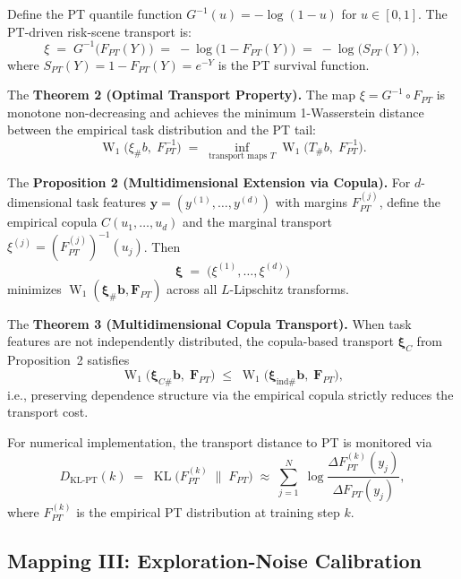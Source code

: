 \documentclass[10pt]{article}
\DeclareMathOperator{\KL}{KL}
\DeclareMathOperator{\W}{W}
\begin{document}
Define the PT quantile function $G^{-1}(u)=-\log(1-u)$ for $u\in[0,1]$.
The PT-driven risk-scene transport is:
\begin{equation}
  \xi \;=\; G^{-1}\!\big(F_{PT}(Y)\big)
       \;=\; -\log\!\big(1 - F_{PT}(Y)\big)
       \;=\; -\log\!\big(S_{PT}(Y)\big),
  \tag{Mapping II}
  \label{eq:mapping2}
\end{equation}
where $S_{PT}(Y)=1-F_{PT}(Y)=e^{-Y}$ is the PT survival function.

The \textbf{Theorem 2 (Optimal Transport Property).}
The map $\xi=G^{-1}\circ F_{PT}$ is monotone non-decreasing and achieves the
minimum 1-Wasserstein distance between the empirical task distribution and the PT tail:
\[
  \W_1\!\big(\xi_\# b,\;F_{PT}^{-1}\big)
  \;=\; \inf_{\text{transport maps }T}
       \W_1\!\big(T_\# b,\;F_{PT}^{-1}\big).
\]

The \textbf{Proposition 2 (Multidimensional Extension via Copula).}
For $d$-dimensional task features $\mathbf{y}=(y^{(1)},\dots,y^{(d)})$ with margins
$F^{(j)}_{PT}$, define the empirical copula $C(u_1,\dots,u_d)$ and the marginal
transport $\xi^{(j)}=(F^{(j)}_{PT})^{-1}(u_j)$.  Then
\[
  \boldsymbol{\xi} \;=\; \big(\xi^{(1)},\dots,\xi^{(d)}\big)
  \tag{Prop 2}
  \label{eq:mapping2_multi}
\]
minimizes $\W_1(\boldsymbol{\xi}_\#\mathbf{b},\mathbf{F}_{PT})$ across all
$L$-Lipschitz transforms.

The \textbf{Theorem 3 (Multidimensional Copula Transport).}
When task features are not independently distributed, the copula-based transport
$\boldsymbol{\xi}_C$ from Proposition~2 satisfies
\[
  \W_1\!\big(\boldsymbol{\xi}_{C\#}\mathbf{b},\;\mathbf{F}_{PT}\big)
  \;\le\; \W_1\!\big(\boldsymbol{\xi}_{\text{ind\#}}\mathbf{b},\;\mathbf{F}_{PT}\big),
\]
i.e., preserving dependence structure via the empirical copula strictly reduces the
transport cost.

For numerical implementation, the transport distance to PT is monitored via
\begin{equation}
  D_{\text{KL-PT}}(k) \;=\;
    \KL\!\big(F_{PT}^{(k)}\;\|\;F_{PT}\big)
    \;\approx\; \sum_{j=1}^{N}\;
      \log\!\frac{\Delta F_{PT}^{(k)}(y_j)}{\Delta F_{PT}(y_j)},
  \tag{Prop 2 / Eq 16}
  \label{eq:kl_pt}
\end{equation}
where $F_{PT}^{(k)}$ is the empirical PT distribution at training step $k$.

\subsection{Mapping III: Exploration-Noise Calibration}
\label{sec:mapping3}
\end{document}
